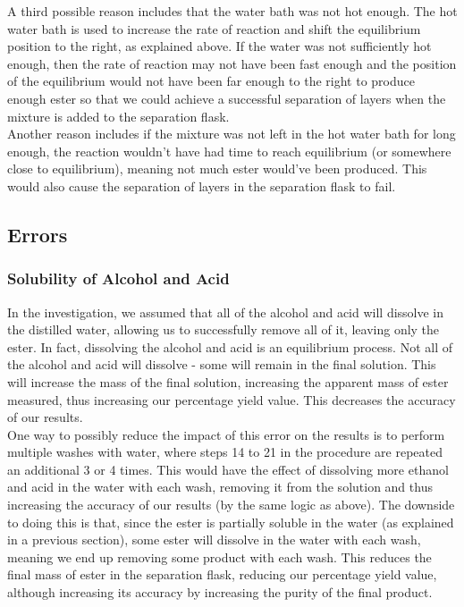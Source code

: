 \documentclass[a4paper,11pt]{article}
\begin{document}
A third possible reason includes that the water bath was not hot enough. The hot
water bath is used to increase the rate of reaction and shift the equilibrium
position to the right, as explained above. If the water was not sufficiently hot
enough, then the rate of reaction may not have been fast enough and the position
of the equilibrium would not have been far enough to the right to produce enough ester
so that we could achieve a successful separation of layers when the mixture is
added to the separation flask. \\

Another reason includes if the mixture was not left in the hot water bath for long enough,
the reaction wouldn't have had time to reach equilibrium (or somewhere close to
equilibrium), meaning not much ester would've been produced. This would also
cause the separation of layers in the separation flask to fail.


\subsection{Errors}

\subsubsection{Solubility of Alcohol and Acid}

In the investigation, we assumed that all of the alcohol and acid will dissolve
in the distilled water, allowing us to successfully remove all of it, leaving
only the ester. In fact, dissolving the alcohol and acid is an equilibrium
process. Not all of
the alcohol and acid will dissolve - some will remain in the final solution.
This will increase the mass of the final solution, increasing the apparent mass
of ester measured, thus increasing our percentage yield value. This decreases
the accuracy of our results. \\

One way to possibly reduce the impact of this error on the results is to perform
multiple washes with water, where steps 14 to 21 in the procedure
are repeated an additional 3 or 4 times. This would have the effect of
dissolving more ethanol and acid in the water with each wash, removing it from
the solution and thus increasing the accuracy of our results (by the same logic
as above). The downside to doing this is that, since the ester is partially
soluble in the water (as explained in a previous section), some ester will
dissolve in the
water with each wash, meaning we end up removing some product with each
wash. This reduces the final mass of ester in the separation flask, reducing our
percentage yield value, although increasing its accuracy by increasing the
purity of the final product.
\end{document}
